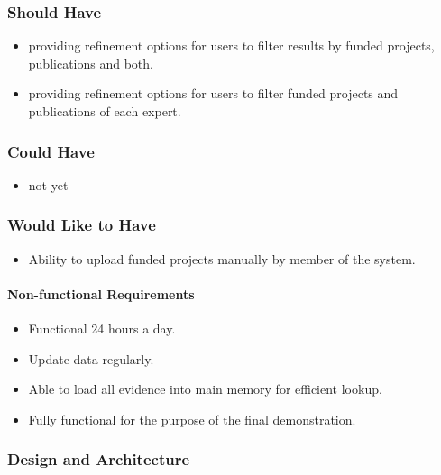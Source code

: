 \subsubsection{Should Have}
\begin{itemize}
 \item providing refinement options for users to filter results by funded projects, publications and both.
 \item providing refinement options for users to filter funded projects and publications of each expert.
\end{itemize}

\subsubsection{Could Have}
\begin{itemize}
 \item not yet
\end{itemize}

\subsubsection{Would Like to Have}
\begin{itemize}
 \item Ability to upload funded projects manually by member of the system.
\end{itemize}

\paragraph{Non-functional Requirements}
\begin{itemize}
 \item Functional 24 hours a day.
 \item Update data regularly.
 \item Able to load all evidence into main memory for efficient lookup.
 \item Fully functional for the purpose of the final demonstration.
\end{itemize}

\subsubsection{Design and Architecture}

